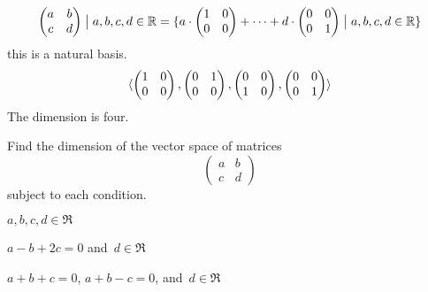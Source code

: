 \begin{exercises}
\begin{answer}
\begin{equation*}
{\begin{pmatrix}
               a  &b  \\
               c  &d
             \end{pmatrix} \bigm|a,b,c,d\in\mathbb{R}}
        =\mbox{$\{a\cdot\begin{pmatrix}
             1  &0  \\
             0  &0
           \end{pmatrix}
           +\dots+
           d\cdot\begin{pmatrix}
             0  &0  \\
             0  &1
           \end{pmatrix} \bigm| a,b,c,d\in\mathbb{R}\}$}
      \end{equation*}
      this is a natural basis.
      \begin{equation*}
        \langle
           \begin{pmatrix}
             1  &0  \\
             0  &0
           \end{pmatrix},
           \begin{pmatrix}
             0  &1  \\
             0  &0
           \end{pmatrix},
           \begin{pmatrix}
             0  &0  \\
             1  &0
           \end{pmatrix},
           \begin{pmatrix}
             0  &0  \\
             0  &1
           \end{pmatrix}  \rangle
      \end{equation*}
      The dimension is four. 
    \end{answer}
  \item 
    Find the dimension of the vector space of matrices
    \begin{equation*}
      \begin{pmatrix}
        a  &b  \\
        c  &d
      \end{pmatrix}
    \end{equation*}
    subject to each condition.
    \begin{exparts*}
      \item $a, b, c, d\in\Re$ 
      \item $a-b+2c=0$ and~$d\in\Re$
      \item $a+b+c=0$, $a+b-c=0$, and~$d\in\Re$

\end{exparts*}
\end{exercises}
